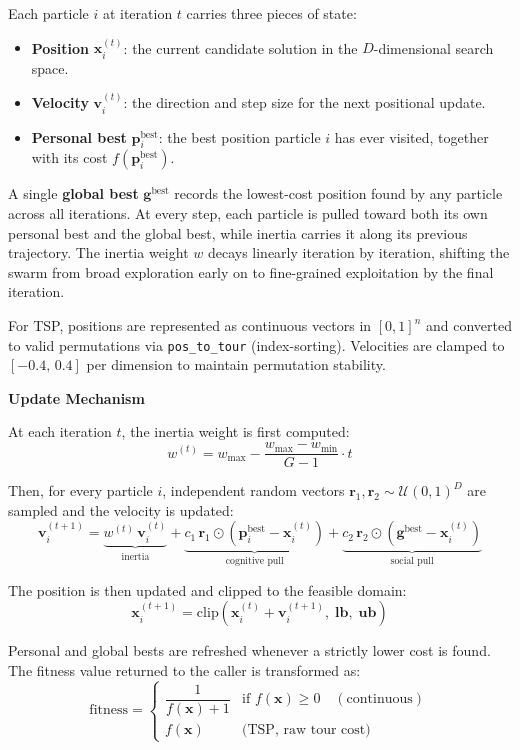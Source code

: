 Each particle $i$ at iteration $t$ carries three pieces of state:
\begin{itemize}
  \item \textbf{Position} $\mathbf{x}_i^{(t)}$: the current candidate solution in the
        $D$-dimensional search space.
  \item \textbf{Velocity} $\mathbf{v}_i^{(t)}$: the direction and step size for the next
        positional update.
  \item \textbf{Personal best} $\mathbf{p}_i^{\text{best}}$: the best position particle $i$
        has ever visited, together with its cost $f(\mathbf{p}_i^{\text{best}})$.
\end{itemize}
A single \textbf{global best} $\mathbf{g}^{\text{best}}$ records the lowest-cost position
found by any particle across all iterations. At every step, each particle is pulled toward
both its own personal best and the global best, while inertia carries it along its previous
trajectory. The inertia weight $w$ decays linearly iteration by iteration, shifting the swarm
from broad exploration early on to fine-grained exploitation by the final iteration.

For TSP, positions are represented as continuous vectors in $[0,1]^n$ and converted to valid
permutations via \texttt{pos\_to\_tour} (index-sorting). Velocities are clamped to
$[-0.4,\,0.4]$ per dimension to maintain permutation stability.

\textbf{Update Mechanism}

At each iteration $t$, the inertia weight is first computed:
\[
w^{(t)} = w_{\max} - \frac{w_{\max} - w_{\min}}{G - 1}\cdot t
\]

Then, for every particle $i$, independent random vectors $\mathbf{r}_1,\mathbf{r}_2
\sim \mathcal{U}(0,1)^D$ are sampled and the velocity is updated:
\[
\mathbf{v}_i^{(t+1)} =
  \underbrace{w^{(t)}\,\mathbf{v}_i^{(t)}}_{\text{inertia}}
+ \underbrace{c_1\,\mathbf{r}_1 \odot \!\left(\mathbf{p}_i^{\text{best}} - \mathbf{x}_i^{(t)}\right)}_{\text{cognitive pull}}
+ \underbrace{c_2\,\mathbf{r}_2 \odot \!\left(\mathbf{g}^{\text{best}} - \mathbf{x}_i^{(t)}\right)}_{\text{social pull}}
\]

The position is then updated and clipped to the feasible domain:
\[
\mathbf{x}_i^{(t+1)} = \mathrm{clip}\!\left(\mathbf{x}_i^{(t)} + \mathbf{v}_i^{(t+1)},\;
                        \mathbf{lb},\; \mathbf{ub}\right)
\]

Personal and global bests are refreshed whenever a strictly lower cost is found.
The fitness value returned to the caller is transformed as:
\[
\text{fitness} =
\begin{cases}
\dfrac{1}{f(\mathbf{x}) + 1} & \text{if } f(\mathbf{x}) \ge 0 \quad (\text{continuous})\\[6pt]
f(\mathbf{x})                 & \text{(TSP, raw tour cost)}
\end{cases}
\]

